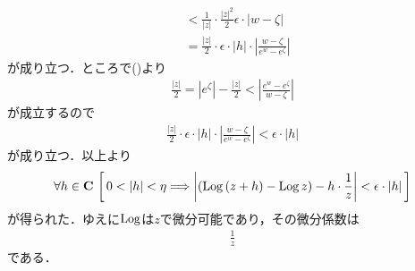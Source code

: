 \begin{sketch}
\begin{description}
\begin{align}
					&< \frac{1}{|z|} \cdot \frac{|z|^2}{2} \epsilon \cdot |w - \zeta| \\
					&= \frac{|z|}{2} \cdot \epsilon \cdot |h| \cdot \left|\frac{w-\zeta}{e^{w} - e^{\zeta}}\right|
				\end{align}
				が成り立つ．ところで()より
				\begin{align}
					\frac{|z|}{2} = |e^{\zeta}| - \frac{|z|}{2} 
					< \left|\frac{e^{w} - e^{\zeta}}{w- \zeta}\right|
				\end{align}
				が成立するので
				\begin{align}
					\frac{|z|}{2} \cdot \epsilon \cdot |h| \cdot \left|\frac{w-\zeta}{e^{w} - e^{\zeta}}\right|
					< \epsilon \cdot |h|
				\end{align}
				が成り立つ．以上より
				\begin{align}
					\forall h \in \mathbf{C}\,
					\left[\, 0 < |h| < \eta \Longrightarrow \left|(\operatorname{Log}{(z+h)} - \operatorname{Log}{z}) - h \cdot \frac{1}{z}\right| < \epsilon \cdot |h|\, \right]
				\end{align}
				が得られた．ゆえに$\operatorname{Log}$は$z$で微分可能であり，その微分係数は
				\begin{align}
					\frac{1}{z}
				\end{align}
				である．
				\QED
		\end{description}
	\end{sketch}